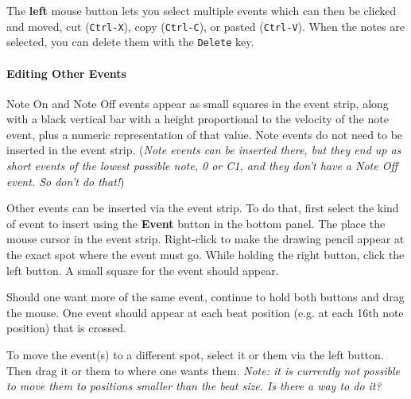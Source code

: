	The \textbf{left} mouse button lets you select multiple events 
   which can then be clicked and moved,
   cut (\texttt{Ctrl-X}), 
   copy (\texttt{Ctrl-C}),
   or pasted (\texttt{Ctrl-V}).
   When the notes are selected,
   you can delete them with the \texttt{Delete} key.

\paragraph{Editing Other Events}
\label{paragraph:seq24_pattern_editor_other_events}


   Note On and Note Off events appear as small squares in the event strip,
   along with a black vertical bar with a height proportional to the
   velocity of the note event, plus a numeric representation of that value.
   Note events do not need to be inserted in the event strip.
   (\textsl{Note events can be inserted there, but they end up as short
   events of the lowest possible note, 0 or C1, and they don't have a Note
   Off event.  So don't do that!})

   Other events can be inserted via the event strip.  To do that, first
   select the kind of event to insert using the \textbf{Event} button in the
   bottom panel.  The place the mouse cursor in the event strip.
   Right-click to make the drawing pencil appear at the exact spot where the
   event must go.  While holding the right button, click the left button.
   A small square for the event should appear.

   Should one want more of the same event, continue to hold both buttons and
   drag the mouse.  One event should appear at each beat position (e.g. at
   each 16th note position) that is crossed.

   To move the event(s) to a different spot, select it or them via the left
   button.  Then drag it or them to where one wants them.
   \textsl{Note: it
   is currently not possible to move them to positions smaller than the
   beat size.  Is there a way to do it?}

